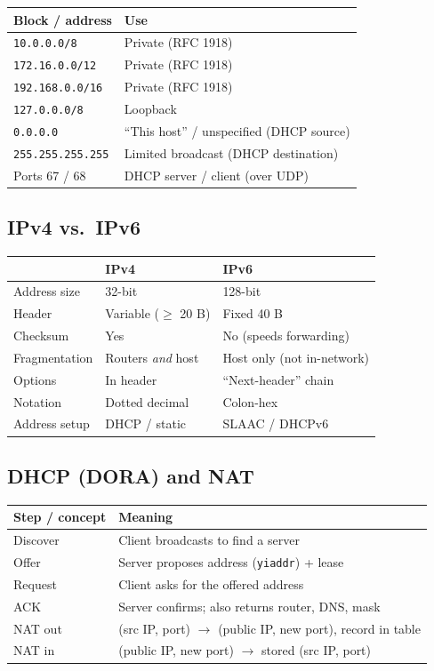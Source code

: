 \documentclass[hidelinks]{article}
\begin{document}
\noindent\begin{tabularx}{\textwidth}{|l|X|}
\hline
\textbf{Block / address} & \textbf{Use} \\
\hline
\texttt{10.0.0.0/8} & Private (RFC 1918) \\
\hline
\texttt{172.16.0.0/12} & Private (RFC 1918) \\
\hline
\texttt{192.168.0.0/16} & Private (RFC 1918) \\
\hline
\texttt{127.0.0.0/8} & Loopback \\
\hline
\texttt{0.0.0.0} & ``This host'' / unspecified (DHCP source) \\
\hline
\texttt{255.255.255.255} & Limited broadcast (DHCP destination) \\
\hline
Ports 67 / 68 & DHCP server / client (over UDP) \\
\hline
\end{tabularx}

\subsection{IPv4 vs.\ IPv6}

\noindent\begin{tabularx}{\textwidth}{|l|X|X|}
\hline
 & \textbf{IPv4} & \textbf{IPv6} \\
\hline
Address size & 32-bit & 128-bit \\
\hline
Header & Variable ($\geq$ 20 B) & Fixed 40 B \\
\hline
Checksum & Yes & No (speeds forwarding) \\
\hline
Fragmentation & Routers \emph{and} host & Host only (not in-network) \\
\hline
Options & In header & ``Next-header'' chain \\
\hline
Notation & Dotted decimal & Colon-hex \\
\hline
Address setup & DHCP / static & SLAAC / DHCPv6 \\
\hline
\end{tabularx}

\subsection{DHCP (DORA) and NAT}

\noindent\begin{tabularx}{\textwidth}{|l|X|}
\hline
\textbf{Step / concept} & \textbf{Meaning} \\
\hline
Discover & Client broadcasts to find a server \\
\hline
Offer & Server proposes address (\texttt{yiaddr}) + lease \\
\hline
Request & Client asks for the offered address \\
\hline
ACK & Server confirms; also returns router, DNS, mask \\
\hline
NAT out & (src IP, port) $\to$ (public IP, new port), record in table \\
\hline
NAT in & (public IP, new port) $\to$ stored (src IP, port) \\
\hline
\end{tabularx}
\end{document}
